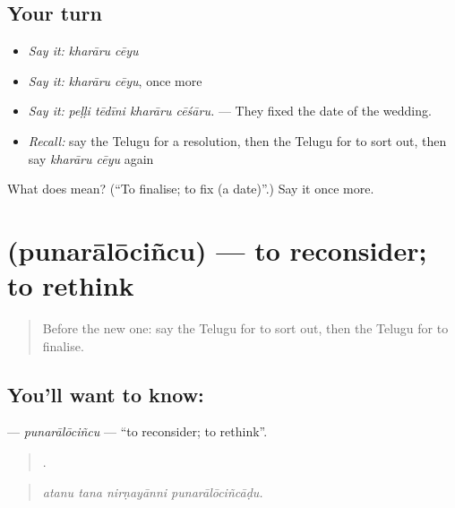\subsection*{Your turn}
\begin{itemize}
\raggedright
  \item \emph{Say it:} \emph{kharāru cēyu}
  \item \emph{Say it:} \emph{kharāru cēyu}, once more
  \item \emph{Say it:} \emph{peḷḷi tēdīni kharāru cēśāru.} — They fixed the date of the wedding.
  \item \emph{Recall:} say the Telugu for a resolution, then the Telugu for to sort out, then say \emph{kharāru cēyu} again
\end{itemize}

\begin{tcolorbox}[breakable,colback=teal!4,colframe=teal!35!black,title={Before you move on}]
What does   mean? (\textquotedblleft{}To finalise; to fix (a date)\textquotedblright{}.) Say it once more.
\end{tcolorbox}
\section[\texorpdfstring{\te{పునరాలోచించు} (punarālōciñcu)}{పునరాలోచించు (punarālōciñcu)}]{ (punarālōciñcu) — to reconsider; to rethink}

\label{lesson:TE-C425-punaralocincu}



\begin{quote}
Before the new one: say the Telugu for to sort out, then the Telugu for to finalise.
\end{quote}

\subsection*{You'll want to know: }
\textbf{} — \emph{punarālōciñcu} — \textquotedblleft{}to reconsider; to rethink\textquotedblright{}.

\begin{quote}
   .
\end{quote}

\begin{quote}
\emph{atanu tana nirṇayānni punarālōciñcāḍu.}
\end{quote}

